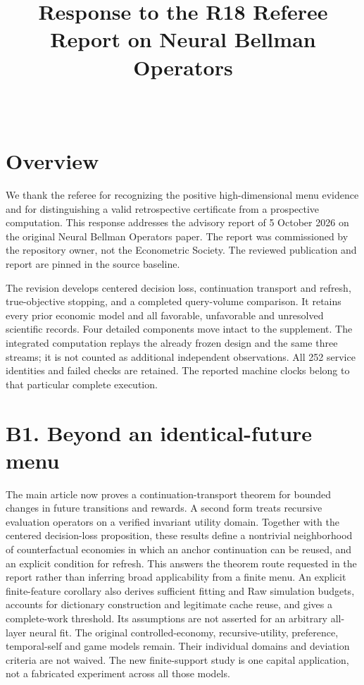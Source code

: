 \documentclass[ecta,nameyear,draft]{econsocart}
\theoremstyle{definition}
\theoremstyle{remark}
\begin{document}
\begin{frontmatter}
\title{Response to the R18 Referee Report on Neural Bellman Operators}
\begin{aug}
\author[id=au1,addressref={add1}]{~}
\address[id=add1]{Peking University}
\end{aug}
\end{frontmatter}
\section{Overview}
We thank the referee for recognizing the positive high-dimensional menu
evidence and for distinguishing a valid retrospective certificate from a
prospective computation. This response addresses the advisory report of
5 October 2026 on the original Neural Bellman Operators paper. The report
was commissioned by the repository owner, not the Econometric Society.
The reviewed publication and report are pinned in the source baseline.

The revision develops centered decision loss, continuation transport and
refresh, true-objective stopping, and a completed query-volume comparison.
It retains every prior economic model and all favorable, unfavorable and
unresolved scientific records. Four detailed components move intact to the
supplement. The integrated computation replays the already frozen design
and the same three streams; it is not counted as additional independent
observations. All 252 service identities and failed checks are retained.
The reported machine clocks belong to that particular complete execution.

\section*{B1. Beyond an identical-future menu}
The main article now proves a continuation-transport theorem for bounded changes in future transitions and rewards. A second form treats recursive evaluation operators on a verified invariant utility domain. Together with the centered decision-loss proposition, these results define a nontrivial neighborhood of counterfactual economies in which an anchor continuation can be reused, and an explicit condition for refresh. This answers the theorem route requested in the report rather than inferring broad applicability from a finite menu. An explicit finite-feature corollary also derives sufficient fitting and Raw simulation budgets, accounts for dictionary construction and legitimate cache reuse, and gives a complete-work threshold. Its assumptions are not asserted for an arbitrary all-layer neural fit. The original controlled-economy, recursive-utility, preference, temporal-self and game models remain. Their individual domains and deviation criteria are not waived. The new finite-support study is one capital application, not a fabricated experiment across all those models.
\end{document}
